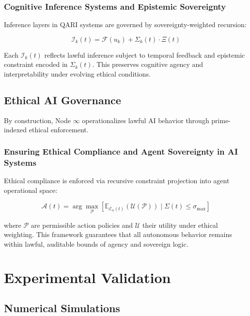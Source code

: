 \documentclass[12pt]{article}
\begin{document}
\subsubsection*{Cognitive Inference Systems and Epistemic Sovereignty}

Inference layers in QARI systems are governed by sovereignty-weighted recursion:

\begin{equation}
\mathcal{I}_k(t) = \mathcal{F}(u_k) + \Sigma_k(t) \cdot \Xi(t)
\end{equation}

Each $\mathcal{I}_k(t)$ reflects lawful inference subject to temporal feedback and epistemic constraint encoded in $\Sigma_k(t)$. This preserves cognitive agency and interpretability under evolving ethical conditions.

\subsection{Ethical AI Governance}

By construction, Node \( \infty \) operationalizes lawful AI behavior through prime-indexed ethical enforcement.

\subsubsection*{Ensuring Ethical Compliance and Agent Sovereignty in AI Systems}

Ethical compliance is enforced via recursive constraint projection into agent operational space:

\begin{equation}
\mathcal{A}(t) = \arg\max_{\mathcal{P}} \left[ \mathbb{E}_{\mathcal{E}_\alpha(t)} \left( \mathcal{U}(\mathcal{P}) \right) \mid \Sigma(t) \leq \sigma_{\text{max}} \right]
\end{equation}

where $\mathcal{P}$ are permissible action policies and $\mathcal{U}$ their utility under ethical weighting. This framework guarantees that all autonomous behavior remains within lawful, auditable bounds of agency and sovereign logic.

\section{Experimental Validation}

\subsection{Numerical Simulations}
\end{document}
